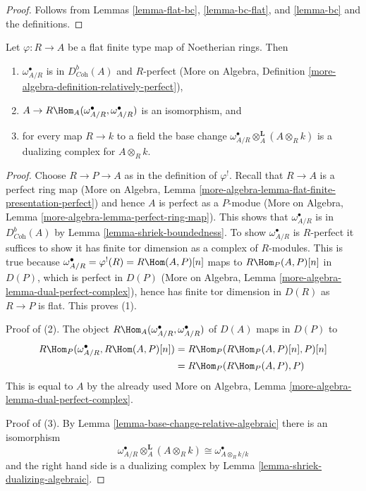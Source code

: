 \begin{proof}
Follows from Lemmas \ref{lemma-flat-bc}, \ref{lemma-bc-flat}, and
\ref{lemma-bc} and the definitions.
\end{proof}

\begin{lemma}
\label{lemma-relative-dualizing-algebraic}
Let $\varphi : R \to A$ be a flat finite type map of Noetherian rings.
Then
\begin{enumerate}
\item $\omega_{A/R}^\bullet$ is in $D^b_{\textit{Coh}}(A)$
and $R$-perfect (More on Algebra,
Definition \ref{more-algebra-definition-relatively-perfect}),
\item $A \to R\Hom_A(\omega_{A/R}^\bullet, \omega_{A/R}^\bullet)$
is an isomorphism, and
\item for every map $R \to k$ to a field the base change
$\omega_{A/R}^\bullet \otimes_A^\mathbf{L} (A \otimes_R k)$
is a dualizing complex for $A \otimes_R k$.
\end{enumerate}
\end{lemma}

\begin{proof}
Choose $R \to P \to A$ as in the definition of $\varphi^!$.
Recall that $R \to A$ is a perfect ring map
(More on Algebra, Lemma
\ref{more-algebra-lemma-flat-finite-presentation-perfect}) and
hence $A$ is perfect as a $P$-modue
(More on Algebra, Lemma \ref{more-algebra-lemma-perfect-ring-map}).
This shows that $\omega_{A/R}^\bullet$ is in $D^b_{\textit{Coh}}(A)$
by Lemma \ref{lemma-shriek-boundedness}.
To show $\omega_{A/R}^\bullet$ is $R$-perfect it suffices to
show it has finite tor dimension as a complex of $R$-modules.
This is true because
$\omega_{A/R}^\bullet = \varphi^!(R) = R\Hom(A, P)[n]$
maps to $R\Hom_P(A, P)[n]$ in $D(P)$, which is perfect in $D(P)$
(More on Algebra, Lemma \ref{more-algebra-lemma-dual-perfect-complex}),
hence has finite tor dimension in $D(R)$
as $R \to P$ is flat. This proves (1).

\medskip\noindent
Proof of (2). The object
$R\Hom_A(\omega_{A/R}^\bullet, \omega_{A/R}^\bullet)$
of $D(A)$ maps in $D(P)$ to
\begin{align*}
R\Hom_P(\omega_{A/R}^\bullet, R\Hom(A, P)[n])
& =
R\Hom_P(R\Hom_P(A, P)[n], P)[n] \\
& =
R\Hom_P(R\Hom_P(A, P), P)
\end{align*}
This is equal to $A$ by the already used
More on Algebra, Lemma \ref{more-algebra-lemma-dual-perfect-complex}.

\medskip\noindent
Proof of (3). By Lemma \ref{lemma-base-change-relative-algebraic}
there is an isomorphism
$$
\omega_{A/R}^\bullet \otimes_A^\mathbf{L} (A \otimes_R k) \cong
\omega^\bullet_{A \otimes_R k/k}
$$
and the right hand side is a dualizing complex by
Lemma \ref{lemma-shriek-dualizing-algebraic}.
\end{proof}

